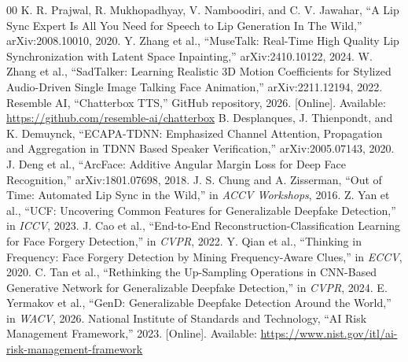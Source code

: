 \documentclass[10pt,conference]{IEEEtran}
\begin{document}
\begin{thebibliography}{00}
 K. R. Prajwal, R. Mukhopadhyay, V. Namboodiri, and C. V. Jawahar, ``A Lip Sync Expert Is All You Need for Speech to Lip Generation In The Wild,'' arXiv:2008.10010, 2020.
 Y. Zhang et al., ``MuseTalk: Real-Time High Quality Lip Synchronization with Latent Space Inpainting,'' arXiv:2410.10122, 2024.
 W. Zhang et al., ``SadTalker: Learning Realistic 3D Motion Coefficients for Stylized Audio-Driven Single Image Talking Face Animation,'' arXiv:2211.12194, 2022.
 Resemble AI, ``Chatterbox TTS,'' GitHub repository, 2026. [Online]. Available: \url{https://github.com/resemble-ai/chatterbox}
 B. Desplanques, J. Thienpondt, and K. Demuynck, ``ECAPA-TDNN: Emphasized Channel Attention, Propagation and Aggregation in TDNN Based Speaker Verification,'' arXiv:2005.07143, 2020.
 J. Deng et al., ``ArcFace: Additive Angular Margin Loss for Deep Face Recognition,'' arXiv:1801.07698, 2018.
 J. S. Chung and A. Zisserman, ``Out of Time: Automated Lip Sync in the Wild,'' in \emph{ACCV Workshops}, 2016.
 Z. Yan et al., ``UCF: Uncovering Common Features for Generalizable Deepfake Detection,'' in \emph{ICCV}, 2023.
 J. Cao et al., ``End-to-End Reconstruction-Classification Learning for Face Forgery Detection,'' in \emph{CVPR}, 2022.
 Y. Qian et al., ``Thinking in Frequency: Face Forgery Detection by Mining Frequency-Aware Clues,'' in \emph{ECCV}, 2020.
 C. Tan et al., ``Rethinking the Up-Sampling Operations in CNN-Based Generative Network for Generalizable Deepfake Detection,'' in \emph{CVPR}, 2024.
 E. Yermakov et al., ``GenD: Generalizable Deepfake Detection Around the World,'' in \emph{WACV}, 2026.
 National Institute of Standards and Technology, ``AI Risk Management Framework,'' 2023. [Online]. Available: \url{https://www.nist.gov/itl/ai-risk-management-framework}
\end{thebibliography}
\end{document}
